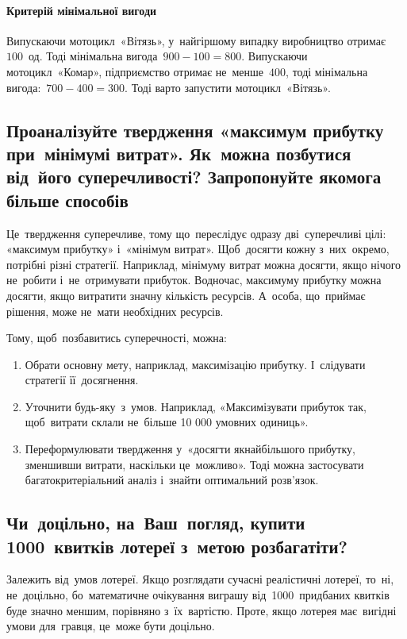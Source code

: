 \documentclass[
  a4paper,
  oneside,
  BCOR = 10mm,
  DIV = 12,
  12pt,
  headings = normal,
]{scrartcl}
\begin{document}
      \paragraph{Критерій мінімальної вигоди}
        Випускаючи мотоцикл~«Вітязь», у~найгіршому випадку виробництво отримає~$100$~од. Тоді мінімальна вигода~$900 - 100 = 800$. Випускаючи мотоцикл~«Комар», підприємство отримає не~менше~$400$, тоді мінімальна вигода:~$700 - 400 = 300$. Тоді варто запустити мотоцикл~«Вітязь».

    \subsection{Проаналізуйте твердження «максимум прибутку при~мінімумі витрат». Як~можна позбутися від~його суперечливості? Запропонуйте якомога більше способів}

      Це~твердження суперечливе, тому що~переслідує одразу дві~суперечливі цілі: «максимум прибутку» і~«мінімум витрат». Щоб~досягти кожну з~них~окремо, потрібні різні стратегії. Наприклад, мінімуму витрат можна досягти, якщо нічого не~робити і~не~отримувати прибуток. Водночас, максимуму прибутку можна досягти, якщо витратити значну кількість ресурсів. А~особа, що~приймає рішення, може не~мати необхідних ресурсів.

      Тому, щоб~позбавитись суперечності, можна:
      \begin{enumerate}
        \item Обрати основну мету, наприклад, максимізацію прибутку. І~слідувати стратегії її~досягнення.

        \item Уточнити будь-яку~з~умов. Наприклад, «Максимізувати прибуток так, щоб~витрати склали не~більше 10 000 умовних одиниць».

        \item Переформулювати твердження у~«досягти якнайбільшого прибутку, зменшивши витрати, наскільки це~можливо». Тоді можна застосувати багатокритеріальний аналіз і~знайти оптимальний розв'язок.
      \end{enumerate}

    \subsection{Чи~доцільно, на~Ваш~погляд, купити 1000~квитків лотереї з~метою розбагатіти?}

      Залежить від~умов лотереї. Якщо розглядати сучасні реалістичні лотереї, то~ні, не~доцільно, бо~математичне очікування виграшу від~1000~придбаних квитків буде значно меншим, порівняно з~їх~вартістю. Проте, якщо лотерея має~вигідні умови для~гравця, це~може бути доцільно.
\end{document}

